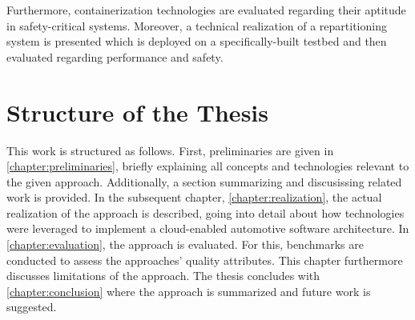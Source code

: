 Furthermore, containerization technologies are evaluated regarding their aptitude in safety-critical systems. Moreover, a technical realization of a repartitioning system is presented which is deployed on a specifically-built testbed and then evaluated regarding performance and safety.

%
%
%
%
%
%
%
%
%
%


\section{Structure of the Thesis}

This work is structured as follows. First, preliminaries are given in \autoref{chapter:preliminaries}, briefly explaining all concepts and technologies relevant to the given approach. Additionally, a section summarizing and discusissing related work is provided. In the subsequent chapter, \autoref{chapter:realization}, the actual realization of the approach is described, going into detail about how technologies were leveraged to implement a cloud-enabled automotive software architecture. In \autoref{chapter:evaluation}, the approach is evaluated. For this, benchmarks are conducted to assess the approaches' quality attributes. This chapter furthermore discusses limitations of the approach. The thesis concludes with \autoref{chapter:conclusion} where the approach is summarized and future work is suggested.

%
%
%
%
%
%
%
%
%
%
%
%
%
%
%
%
%
%
%
%
%
%
%
%
%
%
%
%
%
%
%
%
%
%
%
%
%
%
